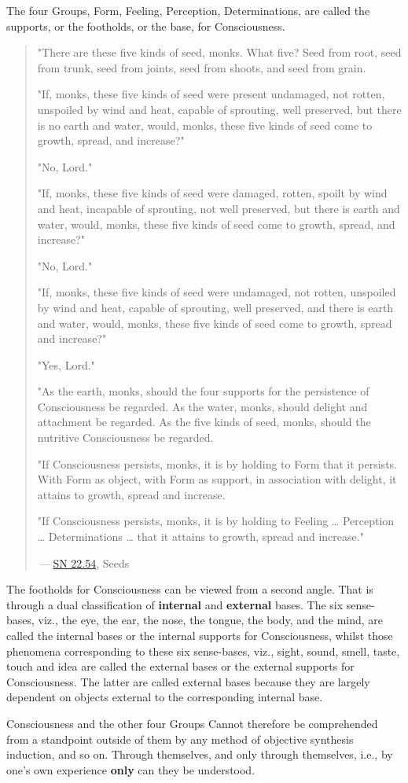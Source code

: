 The four Groups, Form, Feeling, Perception, Determinations, are called
the supports, or the footholds, or the base, for Consciousness.


\begin{quotation}
"There are these five kinds of seed, monks. What five? Seed from root,
seed from trunk, seed from joints, seed from shoots, and seed from
grain.


"If, monks, these five kinds of seed were present undamaged, not rotten,
unspoiled by wind and heat, capable of sprouting, well preserved, but
there is no earth and water, would, monks, these five kinds of seed come
to growth, spread, and increase?"


"No, Lord."


"If, monks, these five kinds of seed were damaged, rotten, spoilt by
wind and heat, incapable of sprouting, not well preserved, but there is
earth and water, would, monks, these five kinds of seed come to growth,
spread, and increase?"


"No, Lord."


"If, monks, these five kinds of seed were undamaged, not rotten,
unspoiled by wind and heat, capable of sprouting, well preserved, and
there is earth and water, would, monks, these five kinds of seed come to
growth, spread and increase?"


"Yes, Lord."


"As the earth, monks, should the four supports for the persistence of
Consciousness be regarded. As the water, monks, should delight and
attachment be regarded. As the five kinds of seed, monks, should the
nutritive Consciousness be regarded.


"If Consciousness persists, monks, it is by holding to Form that it
persists. With Form as object, with Form as support, in association with
delight, it attains to growth, spread and increase.


"If Consciousness persists, monks, it is by holding to Feeling …
Perception … Determinations … that it attains to growth, spread and
increase."


 — \href{https://suttacentral.net/sn22.54/en/bodhi}{SN 22.54}, Seeds


\end{quotation}

The footholds for Consciousness can be viewed from a second angle. That
is through a dual classification of \textbf{internal} and \textbf{external} bases. The
six sense-bases, viz., the eye, the ear, the nose, the tongue, the body,
and the mind, are called the internal bases or the internal supports for
Consciousness, whilst those phenomena corresponding to these six
sense-bases, viz., sight, sound, smell, taste, touch and idea are called
the external bases or the external supports for Consciousness. The
latter are called external bases because they are largely dependent on
objects external to the corresponding internal base.


Consciousness and the other four Groups Cannot therefore be comprehended
from a standpoint outside of them by any method of objective synthesis
induction, and so on. Through themselves, and only through themselves,
i.e., by one’s own experience \textbf{only} can they be understood.


